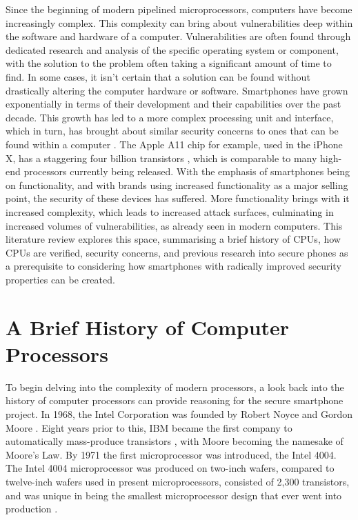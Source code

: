 Since the beginning of modern pipelined microprocessors, computers have become increasingly complex.
This complexity can bring about vulnerabilities deep within the software and hardware of a computer.
Vulnerabilities are often found through dedicated research and analysis of the specific operating system or component, with the solution to the problem often taking a significant amount of time to find.
In some cases, it isn’t certain that a solution can be found without drastically altering the computer hardware or software. 
Smartphones have grown exponentially in terms of their development and their capabilities over the past decade.
This growth has led to a more complex processing unit and interface, which in turn, has brought about similar security concerns to ones that can be found within a computer \citep{RN27}.
The Apple A11 chip for example, used in the iPhone X, has a staggering four billion transistors \citep{RN28}, which is comparable to many high-end processors currently being released.
With the emphasis of smartphones being on functionality, and with brands using increased functionality as a major selling point, the security of these devices has suffered.
More functionality brings with it increased complexity, which leads to increased attack surfaces, culminating in increased volumes of vulnerabilities, as already seen in modern computers.
This literature review explores this space, summarising a brief history of CPUs, how CPUs are verified, security concerns, and previous research into secure phones as a prerequisite to considering how smartphones with radically improved security properties can be created.


\section{A Brief History of Computer Processors}
\label{chap2sec2}

To begin delving into the complexity of modern processors, a look back into the history of computer processors can provide reasoning for the secure smartphone project. 
In 1968, the Intel Corporation was founded by Robert Noyce and Gordon Moore \citep{RN2}.
Eight years prior to this, IBM became the first company to automatically mass-produce transistors \citep{RN2}, with Moore becoming the namesake of Moore’s Law.
By 1971 the first microprocessor was introduced, the Intel 4004.
The Intel 4004 microprocessor was produced on two-inch wafers, compared to twelve-inch wafers used in present microprocessors, consisted of 2,300 transistors, and was unique in being the smallest microprocessor design that ever went into production \citep{RN5}.

